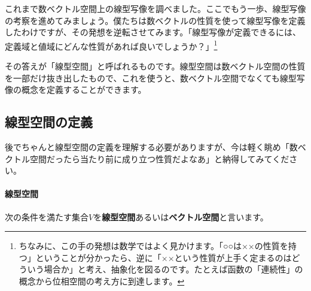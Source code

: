 これまで数ベクトル空間上の線型写像を調べました。ここでもう一歩、線型写像の考察を進めてみましょう。僕たちは数ベクトルの性質を使って線型写像を定義したわけですが、その発想を逆転させてみます。「線型写像が定義できるには、定義域と値域にどんな性質があれば良いでしょうか？」\footnote{ちなみに、この手の発想は数学ではよく見かけます。「○○は××の性質を持つ」ということが分かったら、逆に「××という性質が上手く定まるのはどういう場合か」と考え、抽象化を図るのです。たとえば函数の「連続性」の概念から位相空間の考え方に到達します。}

その答えが「線型空間」と呼ばれるものです。線型空間は数ベクトル空間の性質を一部だけ抜き出したもので、これを使うと、数ベクトル空間でなくても線型写像の概念を定義することができます。

\subsection{線型空間の定義}

後でちゃんと線型空間の定義を理解する必要がありますが、今は軽く眺め「数ベクトル空間だったら当たり前に成り立つ性質だよなあ」と納得してみてください。

\paragraph{線型空間}

次の条件を満たす集合$V$を\textbf{線型空間}あるいは\textbf{ベクトル空間}と言います。

